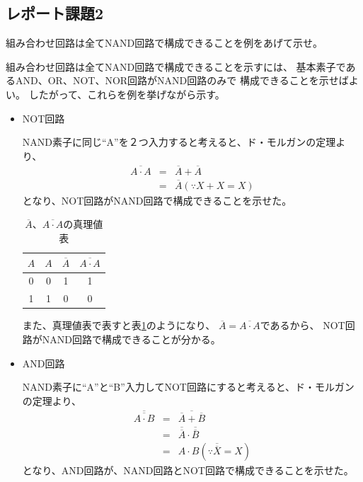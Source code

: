 \documentclass[12pt]{jarticle}
\begin{document}
\subsection{レポート課題2}
\begin{shadebox}
    組み合わせ回路は全てNAND回路で構成できることを例をあげて示せ。
\end{shadebox}
組み合わせ回路は全てNAND回路で構成できることを示すには、
基本素子であるAND、OR、NOT、NOR回路がNAND回路のみで
構成できることを示せばよい。
したがって、これらを例を挙げながら示す。
\begin{itemize}
    \item NOT回路

          NAND素子に同じ``A''を２つ入力すると考えると、ド・モルガンの定理より、
          \begin{eqnarray*}
              \overline{A \cdot A} &=& \overline{A} + \overline{A} \\
              &=& \overline{A}　　(\because X+X=X)
          \end{eqnarray*}
          となり、NOT回路がNAND回路で構成できることを示せた。

          \begin{table}[h]
              \caption{$\overline{A}、 \overline{A \cdot A}$の真理値表}
              \begin{center}
                  \begin{tabular}{|c|c|c|c|}
                      \hline
                      $A$ & $A$ & $\overline{A}$ & $\overline{A \cdot A}$ \\
                      \hline
                      0   & 0   & 1              & 1                      \\
                      \hline
                      1   & 1   & 0              & 0                      \\
                      \hline
                  \end{tabular}
              \end{center}
              \label{repotbl1}
          \end{table}
          また、真理値表で表すと表\ref{repotbl1}のようになり、
          $\overline{A} = \overline{A \cdot A}$であるから、
          NOT回路がNAND回路で構成できることが分かる。

    \item AND回路

          NAND素子に``A''と``B''入力してNOT回路にすると考えると、ド・モルガンの定理より、
          \begin{eqnarray*}
              \overline{\overline{A \cdot B}} &=& \overline{\overline{A} + \overline{B}} \\
              &=& \overline{\overline{A}} \cdot \overline{\overline{B}} \\
              &=& A \cdot B　(\because \overline{\overline{X}}=X)
          \end{eqnarray*}
          となり、AND回路が、NAND回路とNOT回路で構成できることを示せた。


\end{itemize}
\end{document}
